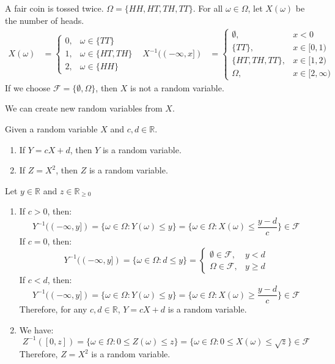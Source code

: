 \documentclass{huhtakm-template-book}
\begin{document}
\newpage
\begin{eg}
	\label{Chapter 3 (Example) Toss coin twice}
	A fair coin is tossed twice. $\Omega=\{HH,HT,TH,TT\}$. For all $\omega\in\Omega$, let $X(\omega)$ be the number of heads.
	\begin{align*}
		X(\omega)&=\begin{cases}
			0, &\omega\in\{TT\}\\
			1, &\omega\in\{HT,TH\}\\
			2, &\omega\in\{HH\}
		\end{cases} & X^{-1}((-\infty,x])&=\begin{cases}
			\emptyset, & x<0\\
			\{TT\}, & x\in[0,1)\\
			\{HT,TH,TT\}, & x\in[1,2)\\
			\Omega, &x\in[2,\infty)
		\end{cases}
	\end{align*}
	If we choose $\mathcal{F}=\{\emptyset,\Omega\}$, then $X$ is not a random variable.
\end{eg}
We can create new random variables from $X$.
\begin{lem}
	Given a random variable $X$ and $c,d\in\mathbb{R}$.
	\begin{enumerate}
		\item If $Y=cX+d$, then $Y$ is a random variable.
		\item If $Z=X^{2}$, then $Z$ is a random variable.
	\end{enumerate}
\end{lem} 
\begin{proofing}
	Let $y\in\mathbb{R}$ and $z\in\mathbb{R}_{\geq 0}$
	\begin{enumerate}
		\item If $c>0$, then:
		\begin{equation*}
			Y^{-1}((-\infty,y])=\{\omega\in\Omega:Y(\omega)\leq y\}=\{\omega\in\Omega:X(\omega)\leq\frac{y-d}{c}\}\in\mathcal{F}
		\end{equation*}
		If $c=0$, then:
		\begin{equation*}
			Y^{-1}((-\infty,y])=\{\omega\in\Omega:d\leq y\}=\begin{cases}
				\emptyset\in\mathcal{F}, &y<d\\
				\Omega\in\mathcal{F}, &y\geq d
			\end{cases}
		\end{equation*}
		If $c<d$, then:
		\begin{equation*}
			Y^{-1}((-\infty,y])=\{\omega\in\Omega:Y(\omega)\leq y\}=\{\omega\in\Omega:X(\omega)\geq\frac{y-d}{c}\}\in\mathcal{F}
		\end{equation*}
		Therefore, for any $c,d\in\mathbb{R}$, $Y=cX+d$ is a random variable.
		\item We have:
		\begin{equation*}
			Z^{-1}([0,z])=\{\omega\in\Omega:0\leq Z(\omega)\leq z\}=\{\omega\in\Omega:0\leq X(\omega)\leq\sqrt{z}\}\in\mathcal{F}
		\end{equation*}
		Therefore, $Z=X^{2}$ is a random variable.
	\end{enumerate}
\end{proofing}
\end{document}
